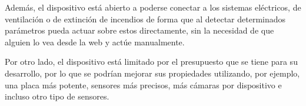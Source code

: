 Además, el dispositivo está abierto a poderse conectar a los sistemas eléctricos, de ventilación o de extinción de incendios de forma que al detectar determinados parámetros pueda actuar sobre estos directamente, sin la necesidad de que alguien lo vea desde la web y actúe manualmente.

Por otro lado, el dispositivo está limitado por el presupuesto que se tiene para su desarrollo, por lo que se podrían mejorar sus propiedades utilizando, por ejemplo, una placa más potente, sensores más precisos, más cámaras por dispositivo e incluso otro tipo de sensores.